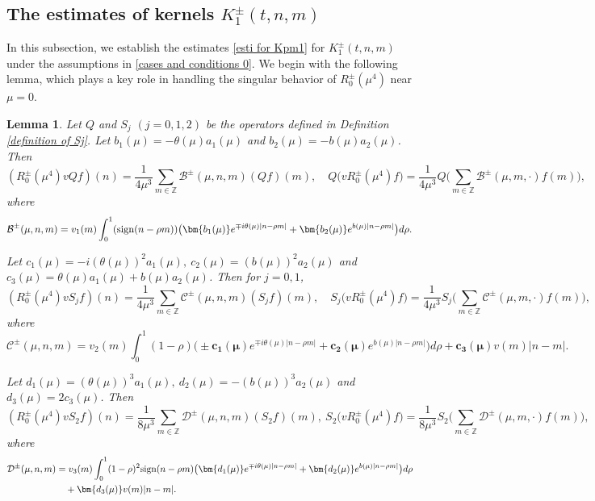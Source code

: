 \documentclass[reqno, 11pt]{amsart}
\newtheorem{lemma}[definition]{Lemma}
\newcommand\Z{\mathbb{Z}}
\newcommand\mcaB{\mathcal{B}}
\newcommand\mcaC{\mathcal{C}}
\newcommand\mcaD{\mathcal{D}}
\numberwithin{equation}{section}
\begin{document}
\subsection{The estimates of kernels $K^{\pm}_1(t,n,m)$}\label{subse of K1}
In this subsection, we establish the estimates \eqref{esti for Kpm1} for $K^{\pm}_1(t,n,m)$ under the assumptions in \eqref{cases and conditions 0}. We begin with the following lemma, which plays a key role in handling the singular behavior of $R^{\pm}_0(\mu^4)$ near $\mu=0$.
\begin{lemma}\label{cancelation lemma}
Let $Q$ and $S_j$ $(j=0,1,2)$ be the operators defined in Definition \ref{definition of Sj}.
\vskip0.2cm
 Let $b_1(\mu)=-\theta(\mu)a_1(\mu)$ and $ b_2(\mu)=-b(\mu)a_2(\mu)$. Then
$$(R^{\pm}_0(\mu^4)vQf)(n)=\frac{1}{4\mu^3}\sum\limits_{m\in\Z}\mcaB^{\pm}(\mu,n,m)(Qf)(m),\quad Q(vR^{\pm}_0(\mu^4)f\big)=\frac{1}{4\mu^3}Q\Big(\sum\limits_{m\in\Z}\mcaB^{\pm}(\mu,m,\cdot)f(m)\Big),$$
where 
\begin{equation*}
    \mcaB^{\pm}(\mu,n,m)=v_1(m)\int_{0}^{1}({\rm sign}(n-\rho m))\big({\bm {b_1(\mu)}}e^{\mp i\theta(\mu)|n-\rho m|}+{\bm {b_2(\mu)}}e^{b(\mu)|n-\rho m|}\big)d\rho.
\end{equation*}
    
 Let $c_1(\mu)=- i(\theta(\mu))^2a_1(\mu), \ c_2(\mu)=(b(\mu))^2a_2(\mu) $ and $c_3(\mu)=\theta(\mu)a_1(\mu)+b(\mu)a_2(\mu)$. Then for $j=0,1$,
$$(R^{\pm}_0(\mu^4)vS_jf)(n)=\frac{1}{4\mu^3}\sum\limits_{m\in\Z}\mcaC^{\pm}(\mu,n,m)(S_jf)(m),\quad S_j\big(vR^{\pm}_0(\mu^4)f\big)=\frac{1}{4\mu^3}S_j\Big(\sum\limits_{m\in\Z}\mcaC^{\pm}(\mu,m,\cdot)f(m)\Big),$$
where 
\begin{equation*}
    \mcaC^{\pm}(\mu,n,m)=v_2(m)\int_{0}^{1}(1-\rho)\big(\pm{\bm{c_1(\mu)}}e^{\mp i\theta(\mu)|n-\rho m|}+{\bm{c_2(\mu)}}e^{b(\mu)|n-\rho m|}\big)d\rho +{\bm{c_3(\mu)}}v(m)|n-m|.
\end{equation*}
    
 Let $d_1(\mu)=(\theta(\mu))^3a_1(\mu),\  d_2(\mu)=-(b(\mu))^3a_2(\mu)$ and $d_3(\mu)=2c_3(\mu)$. Then
$$(R^{\pm}_0(\mu^4)vS_2f)(n)=\frac{1}{8\mu^3}\sum\limits_{m\in\Z}\mcaD^{\pm}(\mu,n,m)(S_2f)(m),\ S_2\big(vR^{\pm}_0(\mu^4)f\big)=\frac{1}{8\mu^3}S_2\Big(\sum\limits_{m\in\Z}\mcaD^{\pm}(\mu,m,\cdot)f(m)\Big),$$
where 
\begin{align*}
    \mcaD^{\pm}(\mu,n,m)&=v_3(m)\int_{0}^{1}(1-\rho)^2{\rm sign}(n-\rho m)\big({\bm{d_1(\mu)}}e^{\mp i\theta(\mu)|n-\rho m|}+{\bm{d_2(\mu)}}e^{b(\mu)|n-\rho m|}\big)d\rho\\
    &\quad+{\bm{d_3(\mu)}}v(m)|n-m|.
\end{align*}
\end{lemma}
\end{document}
